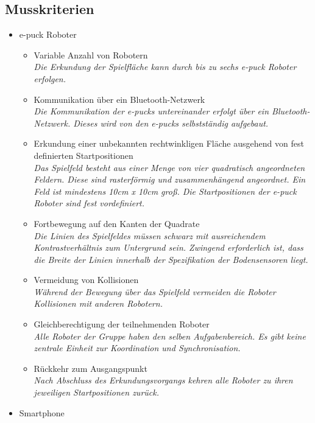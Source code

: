 \documentclass[10pt,a4paper]{article}
\begin{document}
		\subsection{Musskriterien}
			\begin{itemize}
				\item e-puck Roboter
				\begin{itemize}
					\item Variable Anzahl von Robotern
						\\ \textsl{Die Erkundung der Spielfläche kann durch bis zu sechs e-puck Roboter erfolgen.}
					\item Kommunikation über ein Bluetooth-Netzwerk
						\\ \textsl{Die Kommunikation der e-pucks untereinander erfolgt über ein Bluetooth-Netzwerk.
						   Dieses wird von den e-pucks selbstständig aufgebaut.}
					\item Erkundung einer unbekannten rechtwinkligen Fläche ausgehend von fest definierten Startpositionen
						\\ \textsl{Das Spielfeld besteht aus einer Menge von vier quadratisch angeordneten Feldern. Diese sind rasterförmig und
						   zusammenhängend angeordnet. Ein Feld ist mindestens 10cm x 10cm groß. Die Startpositionen der e-puck Roboter
						   sind fest vordefiniert.}
					\item Fortbewegung auf den Kanten der Quadrate
						\\ \textsl{Die Linien des Spielfeldes müssen schwarz mit ausreichendem Kontrastverhältnis
						    zum Untergrund sein. Zwingend erforderlich ist, dass die Breite der Linien innerhalb der Spezifikation der
							Bodensensoren liegt.}		
					\item Vermeidung von Kollisionen
						\\ \textsl{Während der Bewegung über das Spielfeld vermeiden die Roboter Kollisionen mit anderen Robotern.}	
					\item Gleichberechtigung der teilnehmenden Roboter
						\\ \textsl{Alle Roboter der Gruppe haben den selben Aufgabenbereich. Es gibt keine zentrale Einheit
							zur Koordination und Synchronisation.}	
					\item Rückkehr zum Ausgangspunkt
						\\ \textsl{Nach Abschluss des Erkundungsvorgangs kehren alle Roboter zu ihren jeweiligen Startpositionen
							zurück.}	
				\end{itemize}
				\item Smartphone

\end{itemize}
\end{document}
